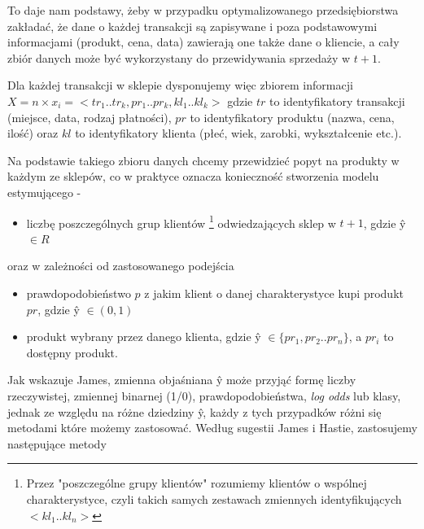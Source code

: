 \documentclass{article}
\begin{document}
To daje nam podstawy, żeby w przypadku optymalizowanego przedsiębiorstwa zakładać, że dane o każdej transakcji są zapisywane i poza podstawowymi informacjami (produkt, cena, data) zawierają one także dane o kliencie, a cały zbiór danych może być wykorzystany do przewidywania sprzedaży w $t + 1$. 

Dla każdej transakcji w sklepie dysponujemy więc zbiorem informacji $ X = n \times x_i = <tr_1..tr_k, pr_1.. pr_k,kl_1..kl_k>$ gdzie $tr$ to identyfikatory transakcji (miejsce, data, rodzaj płatności), $pr$ to identyfikatory produktu (nazwa, cena, ilość) oraz $kl$ to identyfikatory klienta (płeć, wiek, zarobki, wykształcenie etc.). 

Na podstawie takiego zbioru danych chcemy przewidzieć popyt na produkty w każdym ze sklepów, co w praktyce oznacza konieczność stworzenia modelu estymującego - 

	\begin{itemize} 
		\item liczbę poszczególnych grup klientów \footnote{Przez "poszczególne grupy klientów" rozumiemy klientów o wspólnej charakterystyce, czyli takich samych zestawach zmiennych identyfikujących $<kl_1..kl_n>$} odwiedzających sklep w $t+1$, gdzie \^{y} $\in R$ 
	\end{itemize}
	oraz w zależności od zastosowanego podejścia
	\begin{itemize} 
		\item prawdopodobieństwo $p$ z jakim klient o danej charakterystyce kupi produkt $pr$, gdzie \^{y} $\in (0,1)$  
		\item produkt wybrany przez danego klienta, gdzie \^{y} $\in \{pr_1,pr_2..pr_n\}$, a $pr_i$ to dostępny produkt.
	\end{itemize}

Jak wskazuje James, zmienna objaśniana \^{y} może przyjąć formę liczby rzeczywistej, zmiennej binarnej (1/0), prawdopodobieństwa, \textit{log odds} lub klasy, jednak ze względu na różne dziedziny \^{y}, każdy z tych przypadków różni się metodami które możemy zastosować. Według sugestii James i Hastie, zastosujemy następujące metody
\end{document}
